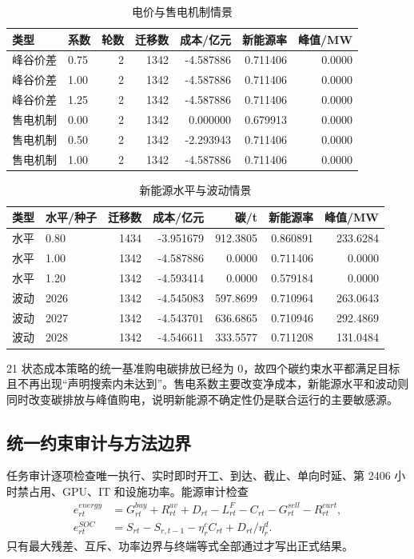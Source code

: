 \begin{table}[H]\centering
{\small
\caption{电价与售电机制情景}\label{tab:q4price}
\begin{tabular}{llrrrrr}\toprule
类型 & 系数 & 轮数 & 迁移数 & 成本/亿元 & 新能源率 & 峰值/MW\\\midrule
峰谷价差 & 0.75 & 2 & 1342 & -4.587886 & 0.711406 & 0.0000\\
峰谷价差 & 1.00 & 2 & 1342 & -4.587886 & 0.711406 & 0.0000\\
峰谷价差 & 1.25 & 2 & 1342 & -4.587886 & 0.711406 & 0.0000\\
售电机制 & 0.00 & 2 & 1342 & 0.000000 & 0.679913 & 0.0000\\
售电机制 & 0.50 & 2 & 1342 & -2.293943 & 0.711406 & 0.0000\\
售电机制 & 1.00 & 2 & 1342 & -4.587886 & 0.711406 & 0.0000\\\bottomrule
\end{tabular}
}
\end{table}

\begin{table}[H]\centering
{\small
\caption{新能源水平与波动情景}\label{tab:q4renewable}
\begin{tabular}{llrrrrr}\toprule
类型 & 水平/种子 & 迁移数 & 成本/亿元 & 碳/t & 新能源率 & 峰值/MW\\\midrule
水平 & 0.80 & 1434 & -3.951679 & 912.3805 & 0.860891 & 233.6284\\
水平 & 1.00 & 1342 & -4.587886 & 0.0000 & 0.711406 & 0.0000\\
水平 & 1.20 & 1342 & -4.593414 & 0.0000 & 0.579184 & 0.0000\\
波动 & 2026 & 1342 & -4.545083 & 597.8699 & 0.710964 & 263.0643\\
波动 & 2027 & 1342 & -4.543701 & 636.6865 & 0.710946 & 292.4869\\
波动 & 2028 & 1342 & -4.546611 & 333.5577 & 0.711208 & 131.0484\\\bottomrule
\end{tabular}
}
\end{table}

21 状态成本策略的统一基准购电碳排放已经为 0，故四个碳约束水平都满足目标且不再出现“声明搜索内未达到”。售电系数主要改变净成本，新能源水平和波动则同时改变碳排放与峰值购电，说明新能源不确定性仍是联合运行的主要敏感源。

\subsection{统一约束审计与方法边界}
任务审计逐项检查唯一执行、实时即时开工、到达、截止、单向时延、第 2406 小时禁占用、GPU、IT 和设施功率。能源审计检查
\begin{align}
e^{energy}_{rt}&=G^{buy}_{rt}+R^{av}_{rt}+D_{rt}-L^F_{rt}-C_{rt}-G^{sell}_{rt}-R^{curt}_{rt},\\
e^{SOC}_{rt}&=S_{rt}-S_{r,t-1}-\eta_r^cC_{rt}+D_{rt}/\eta_r^d.
\end{align}
只有最大残差、互斥、功率边界与终端等式全部通过才写出正式结果。


